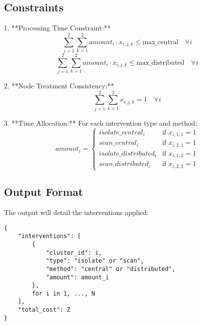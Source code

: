 \documentclass{article}
\begin{document}
\subsection*{Constraints}
1. **Processing Time Constraint:**
\[
\sum_{j=1}^{2} \sum_{k=1}^{2} amount_i \cdot x_{i,j,k} \leq \text{max\_central} \quad \forall i
\]
\[
\sum_{j=1}^{2} \sum_{k=1}^{2} amount_i \cdot x_{i,j,k} \leq \text{max\_distributed} \quad \forall i
\]

2. **Node Treatment Consistency:**
\[
\sum_{j=1}^2 \sum_{k=1}^2 x_{i,j,k} = 1 \quad \forall i
\]

3. **Time Allocation:**
For each intervention type and method:
\[
amount_i = 
\begin{cases} 
isolate\_central_i & \text{if } x_{i,1,1} = 1 \\
scan\_central_i & \text{if } x_{i,2,1} = 1 \\
isolate\_distributed_i & \text{if } x_{i,1,2} = 1 \\
scan\_distributed_i & \text{if } x_{i,2,2} = 1 
\end{cases}
\]

\subsection*{Output Format}
The output will detail the interventions applied:
\begin{verbatim}
{
    "interventions": [
        {
            "cluster_id": i,
            "type": "isolate" or "scan",
            "method": "central" or "distributed",
            "amount": amount_i
        },
        for i in 1, ..., N
    ],
    "total_cost": Z
}
\end{verbatim}
\end{document}
